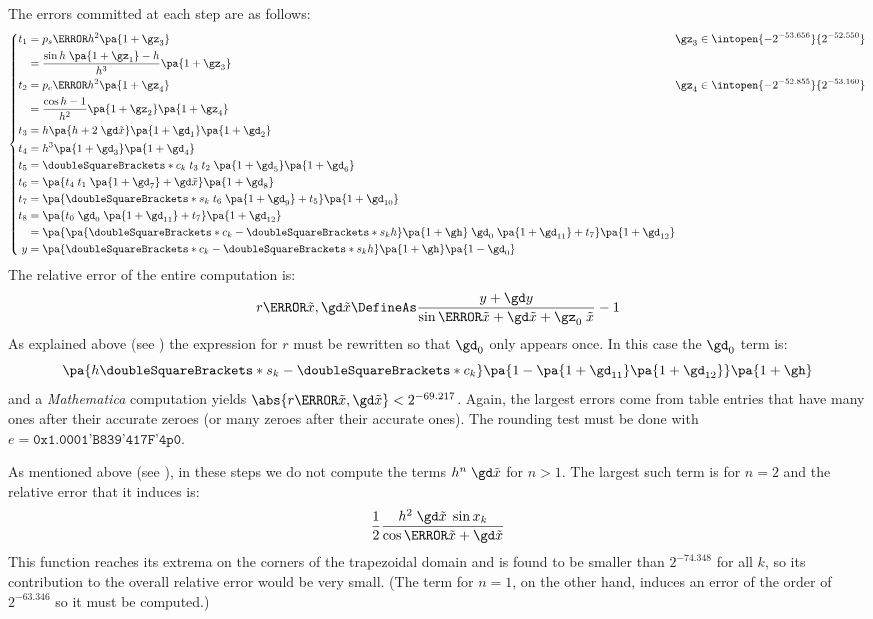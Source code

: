 \documentclass[10pt, a4paper, twoside]{basestyle}
\newcommand{\round}[1]{\doubleSquareBrackets*{#1}}
\newcommand{\red}[1]{\tilde{#1}}
\begin{document}
The errors committed at each step are as follows:
\[
\left\{
\begin{alignedat}{2}
t_1 &= p_s\of{h^2} \pa{1 + \gz_3} \qquad & \gz_3 \in \intopen{-2^{-53.656}}{2^{-52.550}} \\
&= \frac{\sin h \; \pa{1 + \gz_1} - h}{h^3} \pa{1 + \gz_3} \\
t_2 &= p_c\of{h^2} \pa{1 + \gz_4} \qquad & \gz_4 \in \intopen{-2^{-52.855}}{2^{-53.160}} \\
&= \frac{\cos h - 1}{h^2} \pa{1 + \gz_2} \pa{1 + \gz_4} \\
t_3 &= h \pa{h + 2 \; \gd \red x} \pa{1 + \gd_1} \pa{1 + \gd_2} \\
t_4 &= h^3 \pa{1 + \gd_3} \pa{1 + \gd_4} \\
t_5 &= \round{c_k} \; t_3 \; t_2 \; \pa{1 + \gd_5} \pa{1 + \gd_6} \\
t_6 &= \pa{t_4 \; t_1 \; \pa{1 + \gd_7} + \gd \red x} \pa{1 + \gd_8} \\
t_7 &= \pa{\round{s_k} \; t_6 \; \pa{1 + \gd_9} + t_5} \pa{1 + \gd_{10}} \\
t_8 &= \pa{t_0 \; \gd_0 \; \pa{1 + \gd_{11}} + t_7} \pa{1 + \gd_{12}} \\
&= \pa{\pa{\round{c_k} - \round{s_k} h} \pa{1 + \gh} \; \gd_0 \; \pa{1 + \gd_{11}} + t_7} \pa{1 + \gd_{12}} \\
y &= \pa{\round{c_k} - \round{s_k} h} \pa{1 + \gh} \pa{1 - \gd_0}
\end{alignedat}
\right.
\]
The relative error of the entire computation is:
\[
r\of{\red x, \gd \red x} \DefineAs \frac{y + \gd y}{\sin\of{\red x + \gd \red x + \gz_0 \; \red x}} - 1
\]
As explained above (see ) the expression for $r$ must be rewritten so that $\gd_0$ only appears once.  In this case the $\gd_0$ term is:
\[
\pa{h \round{s_k} - \round{c_k}} \pa{1 - \pa{1 + \gd_{11}} \pa{1 + \gd_{12}}} \pa{1 + \gh}
\]
and a \textit{Mathematica} computation yields $\abs{r\of{\red x, \gd \red x}} < 2^{-69.217}$.  Again, the largest errors come from table entries that have many ones after their accurate zeroes (or many zeroes after their accurate ones).  The rounding test must be done with $e = \texttt{0x1.0001'B839'417F'4p0}$.

As mentioned above (see ), in these steps we do not compute the terms $h^n \; \gd \red x$ for $n > 1$.  The largest such term is for $n = 2$ and the relative error that it induces is:
\[
\frac{1}{2}\frac{h^2 \; \gd \red x \; \sin x_k}{\cos\of{\red x + \gd \red x}}
\]
This function reaches its extrema on the corners of the trapezoidal domain and is found to be smaller than $2^{-74.348}$ for all $k$, so its contribution to the overall relative error would be very small.  (The term for $n = 1$, on the other hand, induces an error of the order of $2^{-63.346}$ so it must be computed.)
\end{document}
